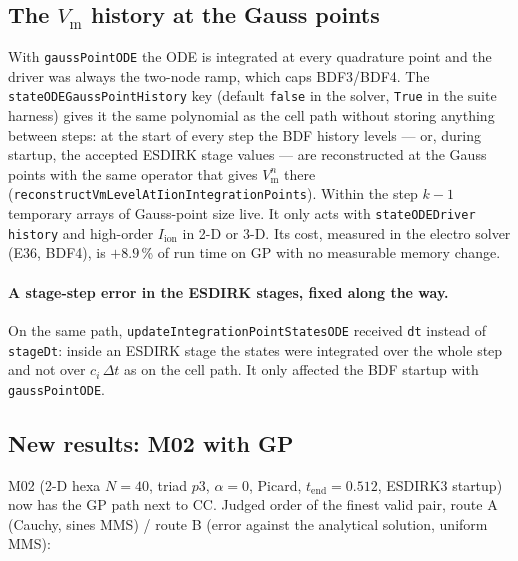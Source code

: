 \documentclass[11pt,a4paper]{article}
\newcommand{\code}[1]{\texttt{\small #1}}
\newcommand{\Vm}{V_{\text{m}}}
\newcommand{\Iion}{I_{\mathrm{ion}}}
\begin{document}
\subsection{The \texorpdfstring{$\Vm$}{Vm} history at the Gauss points}
\label{sec:oct-gausshist}

With \code{gaussPointODE} the ODE is integrated at every quadrature point and the
driver was always the two-node ramp, which caps BDF3/BDF4. The
\code{stateODEGaussPointHistory} key (default \code{false} in the solver,
\code{True} in the suite harness) gives it the same polynomial as the cell path
without storing anything between steps: at the start of every step the BDF history
levels --- or, during startup, the accepted ESDIRK stage values --- are
reconstructed at the Gauss points with the same operator that gives $\Vm^n$ there
(\code{reconstructVmLevelAtIionIntegrationPoints}). Within the step $k-1$ temporary
arrays of Gauss-point size live. It only acts with \code{stateODEDriver history}
and high-order $\Iion$ in 2-D or 3-D. Its cost, measured in the electro solver
(E36, BDF4), is $+8.9$\,\% of run time on GP with no measurable memory change.

\paragraph{A stage-step error in the ESDIRK stages, fixed along the way.} On the
same path, \code{updateIntegrationPointStatesODE} received \code{dt} instead of
\code{stageDt}: inside an ESDIRK stage the states were integrated over the whole
step and not over $c_i\,\Delta t$ as on the cell path. It only affected the BDF
startup with \code{gaussPointODE}.

\subsection{New results: M02 with GP}
\label{sec:oct-results}

M02 (2-D hexa $N=40$, triad $p3$, $\alpha=0$, Picard, $t_{\text{end}}=0.512$, ESDIRK3
startup) now has the GP path next to CC. Judged order of the finest valid pair,
route A (Cauchy, sines MMS) / route B (error against the analytical solution,
uniform MMS):
\end{document}
